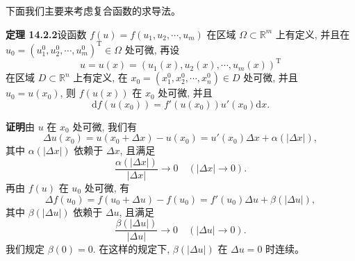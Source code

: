 \documentclass[UTF8,12pt,a4paper,fontset=fandol]{ctexart}
\begin{document}
下面我们主要来考虑复合函数的求导法。

\noindent\textbf{定理 14.2.2}\quad 设函数 $f(u)=f(u_1,u_2,\cdots,u_m)$ 在区域 $\Omega\subset\mathbb R^m$ 上有定义, 并且在 $u_0=(u_1^0,u_2^0,\cdots,u_m^0)^\mathrm T\in\Omega$ 处可微, 再设
\[
  u=u(x)=(u_1(x),u_2(x),\cdots,u_m(x))^\mathrm T
\]
在区域 $D\subset\mathbb R^n$ 上有定义, 在 $x_0=(x_1^0,x_2^0,\cdots,x_n^0)\in D$ 处可微, 并且 $u_0=u(x_0)$, 则 $f(u(x))$ 在 $x_0$ 处可微, 并且
\[
  \mathrm df(u(x_0))=f'(u(x_0))u'(x_0)\mathrm dx.
\]

\noindent\textbf{证明}\quad 由 $u$ 在 $x_0$ 处可微, 我们有
\[
  \Delta u(x_0)=u(x_0+\Delta x)-u(x_0)
  =u'(x_0)\Delta x+\alpha(|\Delta x|),
\]
其中 $\alpha(|\Delta x|)$ 依赖于 $\Delta x$, 且满足
\[
  \frac{\alpha(|\Delta x|)}{|\Delta x|}\to0\quad(|\Delta x|\to0).
\]
再由 $f(u)$ 在 $u_0$ 处可微, 有
\[
  \Delta f(u_0)=f(u_0+\Delta u)-f(u_0)=f'(u_0)\Delta u+\beta(|\Delta u|),
\]
其中 $\beta(|\Delta u|)$ 依赖于 $\Delta u$, 且满足
\[
  \frac{\beta(|\Delta u|)}{|\Delta u|}\to0\quad(|\Delta u|\to0).
\]
我们规定 $\beta(0)=0$. 在这样的规定下, $\beta(|\Delta u|)$ 在 $\Delta u=0$ 时连续。
\end{document}
